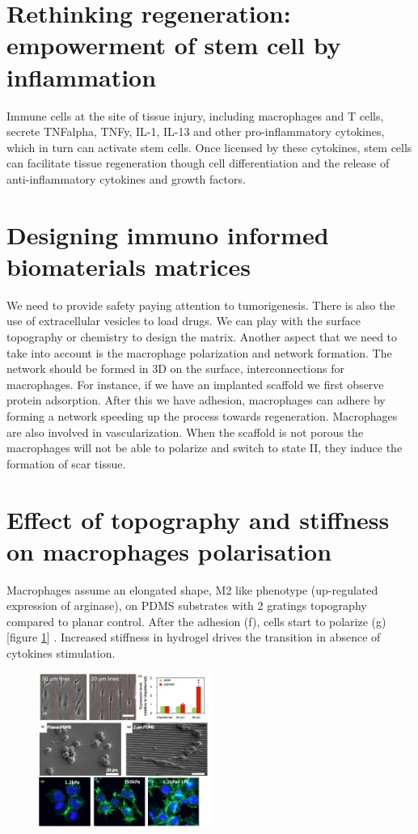 \section{Rethinking regeneration: empowerment of stem cell by inflammation}
Immune cells at the site of tissue injury, including macrophages and T cells, secrete TNFalpha, TNFy, IL-1, IL-13 and other pro-inflammatory cytokines, which in turn can activate stem cells. 
Once licensed by these cytokines, stem cells can facilitate tissue regeneration though cell differentiation and the release of anti-inflammatory cytokines and growth factors.

\section{Designing immuno informed biomaterials matrices}
We need to provide safety paying attention to tumorigenesis.
There is also the use of extracellular vesicles to load drugs.
We can play with the surface topography or chemistry to design the matrix.
Another aspect that we need to take into account is the macrophage polarization and network formation.
The network should be formed in 3D on the surface, interconnections for macrophages.
For instance, if we have an implanted scaffold we first observe protein adsorption. 
After this we have adhesion, macrophages can adhere by forming a network speeding up the process towards regeneration. 
Macrophages are also involved in vascularization. 
When the scaffold is not porous the macrophages will not be able to polarize and switch to state II, they induce the formation of scar tissue.

\section{Effect of topography and stiffness on macrophages polarisation}
Macrophages assume an elongated shape, M2 like phenotype (up-regulated expression of arginase), on PDMS substrates with 2 gratings topography compared to planar control.
After the adhesion (f), cells start to polarize (g) [figure \ref{fig:topo}] .  Increased stiffness in hydrogel drives the transition in absence of cytokines stimulation. 

\begin{figure}[ht]
\centering
\includegraphics[width=0.5\textwidth]{topo}
\caption{\label{fig:topo}}
\end{figure}

